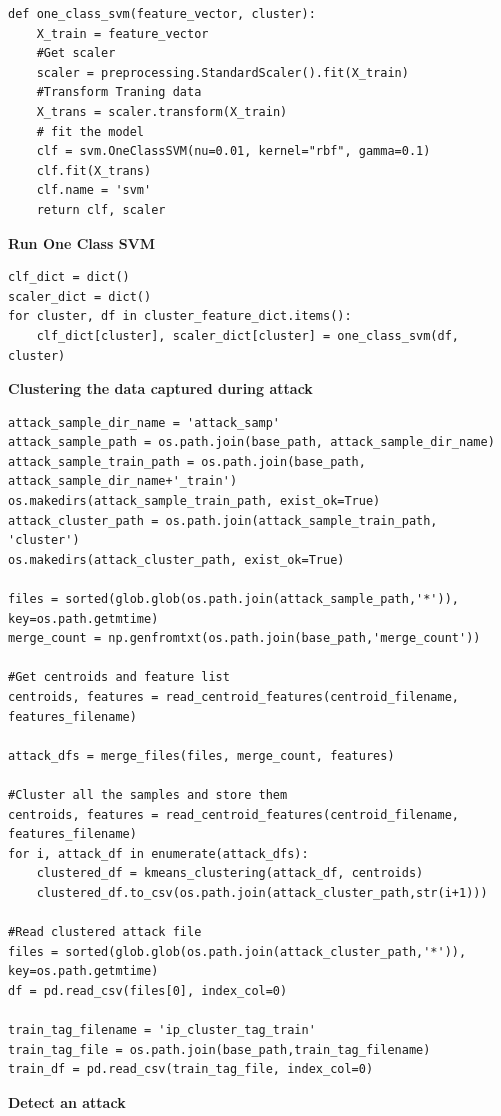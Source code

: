 \documentclass{article}
\begin{document}
\begin{verbatim}
def one_class_svm(feature_vector, cluster):
    X_train = feature_vector
    #Get scaler
    scaler = preprocessing.StandardScaler().fit(X_train)
    #Transform Traning data
    X_trans = scaler.transform(X_train)
    # fit the model
    clf = svm.OneClassSVM(nu=0.01, kernel="rbf", gamma=0.1)
    clf.fit(X_trans)
    clf.name = 'svm'
    return clf, scaler
\end{verbatim}
\textbf{Run One Class SVM}
\begin{verbatim}
clf_dict = dict()
scaler_dict = dict()
for cluster, df in cluster_feature_dict.items():
    clf_dict[cluster], scaler_dict[cluster] = one_class_svm(df, cluster)
\end{verbatim}
\pagebreak
\textbf{\Large{Clustering the data captured during attack}}
\begin{verbatim}
attack_sample_dir_name = 'attack_samp'
attack_sample_path = os.path.join(base_path, attack_sample_dir_name)
attack_sample_train_path = os.path.join(base_path, attack_sample_dir_name+'_train')
os.makedirs(attack_sample_train_path, exist_ok=True)
attack_cluster_path = os.path.join(attack_sample_train_path, 'cluster')
os.makedirs(attack_cluster_path, exist_ok=True)

files = sorted(glob.glob(os.path.join(attack_sample_path,'*')),  key=os.path.getmtime)
merge_count = np.genfromtxt(os.path.join(base_path,'merge_count'))

#Get centroids and feature list
centroids, features = read_centroid_features(centroid_filename, features_filename)

attack_dfs = merge_files(files, merge_count, features)

#Cluster all the samples and store them
centroids, features = read_centroid_features(centroid_filename, features_filename)
for i, attack_df in enumerate(attack_dfs):
    clustered_df = kmeans_clustering(attack_df, centroids)
    clustered_df.to_csv(os.path.join(attack_cluster_path,str(i+1)))

#Read clustered attack file
files = sorted(glob.glob(os.path.join(attack_cluster_path,'*')),  key=os.path.getmtime)
df = pd.read_csv(files[0], index_col=0)

train_tag_filename = 'ip_cluster_tag_train'
train_tag_file = os.path.join(base_path,train_tag_filename)
train_df = pd.read_csv(train_tag_file, index_col=0)
\end{verbatim}
\textbf{\Large{Detect an attack}}
\end{document}
